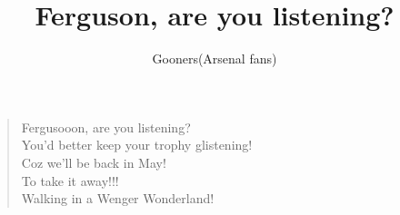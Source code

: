 \documentclass[a4paper,12pt]{article}
\title{Ferguson, are you listening?}
\author{Gooners(Arsenal fans)}
\date{}
\begin{document}
	
	\maketitle
	
	\begin{verse}
		
		Fergusooon, are you listening? \\
		You'd better keep your trophy glistening! \\
		Coz we'll be back in May! \\
		To take it away!!! \\
		Walking in a Wenger Wonderland!
		
	\end{verse}
	
\end{document}
